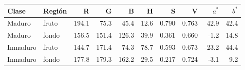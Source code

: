 \footnotesize
\begin{tabular}{llrrrrrrrr}
\toprule
Clase & Región & R & G & B & H & S & V & $a^*$ & $b^*$ \\
\midrule
Maduro & fruto & 194.1 & 75.3 & 45.4 & 12.6 & 0.790 & 0.763 & 42.9 & 42.4 \\
Maduro & fondo & 156.5 & 151.4 & 126.3 & 39.9 & 0.361 & 0.660 & -1.2 & 14.8 \\
Inmaduro & fruto & 144.7 & 171.4 & 74.3 & 78.7 & 0.593 & 0.673 & -23.2 & 44.4 \\
Inmaduro & fondo & 177.8 & 179.3 & 162.2 & 29.5 & 0.217 & 0.724 & -3.1 & 9.2 \\
\bottomrule
\end{tabular}

